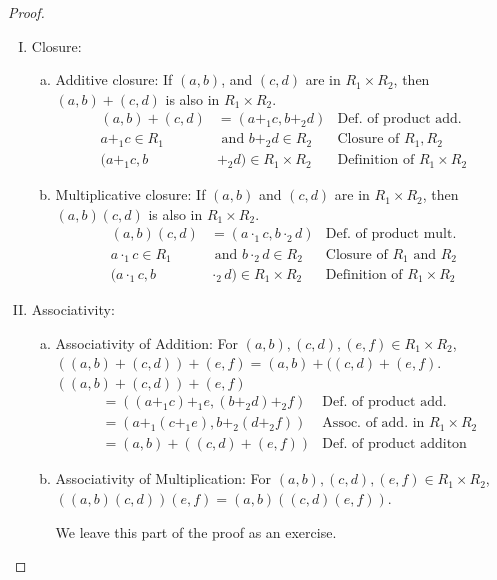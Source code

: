 \begin{proof}
\begin{enumerate}[(I)]
\item Closure: 
\begin{enumerate}[(a)]
\item Additive closure: If $(a,b)$, and $(c,d)$ are in $R_1\times R_2$, then $(a,b)+(c,d)$ is also in $R_1\times R_2$.
\begin{align*}
(a,b)+(c,d)&=(a+_1c,b+_2d) & \text{Def. of product add.}\\
a+_1 c \in R_1 & \text{ and } b+_2d\in R_2 & \text{Closure of } R_1, R_2\\
(a+_1c,b&+_2d)\in R_1\times R_2 & \text{Definition of }R_1\times R_2
\end{align*}
\item Multiplicative closure: If $(a,b)$ and $(c,d)$ are in $R_1\times R_2$, then $(a,b)(c,d)$ is also in $R_1\times R_2$.
\begin{align*}
(a,b)(c,d)&=(a\cdot_1 c, b\cdot_2 d) & \text{Def. of product mult.}\\
a\cdot_1c\in R_1 & \text{ and }b\cdot_2d\in R_2 & \text{Closure of $R_1$ and $R_2$}\\
(a\cdot_1c,b&\cdot_2d)\in R_1\times R_2 & \text{Definition of $R_1\times R_2$} 
\end{align*}
\end{enumerate}
\item Associativity:
\begin{enumerate}[(a)]
\item Associativity of Addition:  For $(a,b),(c,d),(e,f)\in R_1\times R_2$,\\ 
$((a,b)+(c,d))+(e,f)=(a,b)+((c,d)+(e,f)$.\\

$((a,b)+(c,d))+(e,f)$
\begin{align*}
&=((a+_1c)+_1e,(b+_2d)+_2f) & \text{Def. of product add.}\\
&=(a+_1(c+_1e),b+_2(d+_2f)) & \text{Assoc. of add. in $R_1\times R_2$}\\
&=(a,b)+((c,d)+(e,f)) & \text{Def. of product additon}
\end{align*}
\item Associativity of Multiplication:  For $(a,b),(c,d),(e,f)\in R_1\times R_2$,\\   
$((a,b)(c,d))(e,f) = (a,b)((c,d)(e,f))$.

We leave this part of the proof as an exercise.
\end{enumerate}


\end{enumerate}
\end{proof}
